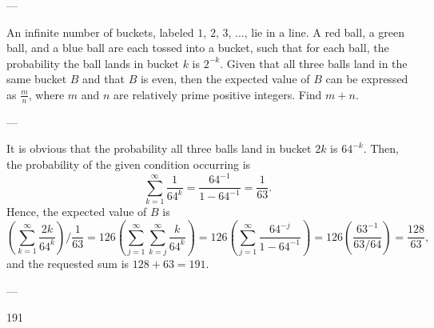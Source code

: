 
---

An infinite number of buckets, labeled $1$, $2$, $3$, $\ldots$, lie in a line. A red ball, a green ball, and a blue ball are each tossed into a bucket, such that for each ball, the probability the ball lands in bucket $k$ is $2^{-k}$. Given that all three balls land in the same bucket $B$ and that $B$ is even, then the expected value of $B$ can be expressed as $\tfrac mn$, where $m$ and $n$ are relatively prime positive integers. Find $m+n$. 

---

It is obvious that the probability all three balls land in bucket $2k$ is $64^{-k}$. Then, the probability of the given condition occurring is\[\sum_{k=1}^\infty \frac1{64^k}=\frac{64^{-1}}{1-64^{-1}}=\frac1{63}.\]Hence, the expected value of $B$ is\[\left(\sum_{k=1}^\infty\frac{2k}{64^k}\right)\bigg/\frac1{63}=126\left(\sum_{j=1}^\infty\sum_{k=j}^\infty\frac k{64^k}\right)=126\left(\sum_{j=1}^\infty\frac{64^{-j}}{1-64^{-1}}\right)=126\left(\frac{63^{-1}}{63/64}\right)=\frac{128}{63},\]and the requested sum is $128+63=191$.


---

191
